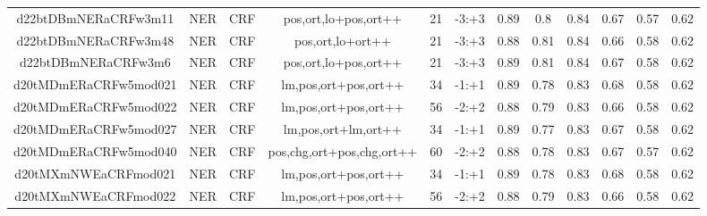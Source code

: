 \documentclass[a4paper]{article}
\begin{document}
\begin{landscape}
\begin{center}
\begin{tabular}{ |c|c|c|c|c|c|c|c|c|c|c|c|}
 	
 
 	
 		
 		\small{ d22btDBmNERaCRFw3m11 } & NER & CRF & pos,ort,lo+pos,ort++  &  21 &  -3:+3  &  0.89 & 0.8 & 0.84  &  0.67 & 0.57 & 0.62 \\
 		

 	
 
 	
 		
 		\small{ d22btDBmNERaCRFw3m48 } & NER & CRF & pos,ort,lo+ort++  &  21 &  -3:+3  &  0.88 & 0.81 & 0.84  &  0.66 & 0.58 & 0.62 \\
 		

 	
 
 	
 		
 		\small{ d22btDBmNERaCRFw3m6 } & NER & CRF & pos,ort,lo+pos,ort++  &  21 &  -3:+3  &  0.89 & 0.81 & 0.84  &  0.67 & 0.58 & 0.62 \\
 		

 	
 
 	
 		
 		\small{ d20tMDmERaCRFw5mod021 } & NER & CRF & lm,pos,ort+pos,ort++  &  34 &  -1:+1  &  0.89 & 0.78 & 0.83  &  0.68 & 0.58 & 0.62 \\
 		

 	
 
 	
 		
 		\small{ d20tMDmERaCRFw5mod022 } & NER & CRF & lm,pos,ort+pos,ort++  &  56 &  -2:+2  &  0.88 & 0.79 & 0.83  &  0.66 & 0.58 & 0.62 \\
 		

 	
 
 	
 		
 		\small{ d20tMDmERaCRFw5mod027 } & NER & CRF & lm,pos,ort+lm,ort++  &  34 &  -1:+1  &  0.89 & 0.77 & 0.83  &  0.67 & 0.58 & 0.62 \\
 		

 	
 
 	
 		
 		\small{ d20tMDmERaCRFw5mod040 } & NER & CRF & pos,chg,ort+pos,chg,ort++  &  60 &  -2:+2  &  0.88 & 0.78 & 0.83  &  0.67 & 0.57 & 0.62 \\
 		

 	
 
 	
 		
 		\small{ d20tMXmNWEaCRFmod021 } & NER & CRF & lm,pos,ort+pos,ort++  &  34 &  -1:+1  &  0.89 & 0.78 & 0.83  &  0.68 & 0.58 & 0.62 \\
 		

 	
 
 	
 		
 		\small{ d20tMXmNWEaCRFmod022 } & NER & CRF & lm,pos,ort+pos,ort++  &  56 &  -2:+2  &  0.88 & 0.79 & 0.83  &  0.66 & 0.58 & 0.62 \\
 		


\end{tabular}
\end{center}
\end{landscape}
\end{document}
